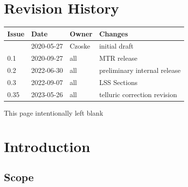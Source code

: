 \documentclass[11pt,oneside,a4paper]{article}
\begin{document}





\clearpage
\pagestyle{fancy}

\section*{Revision History}

\renewcommand{\arraystretch}{1.2}
\begin{tabularx}{\textwidth}{|l|l|l|X|}
  \hline
  \rowcolor{rd1}
  \textbf{Issue} & \textbf{Date} & \textbf{Owner} & \textbf{Changes} \\
  \hline
                 & 2020-05-27    & Czoske         & initial draft    \\
  0.1            & 2020-09-27    & all            & MTR release      \\
  0.2            & 2022-06-30    & all            & preliminary internal release      \\
  0.3            & 2022-09-07    & all  & LSS Sections \\
  0.35           & 2023-05-26    & all   & telluric correction revision \\
  \hline
\end{tabularx}


\newpage
\tableofcontents
\clearpage
\listoffigures
\clearpage
\listoftables

\clearpage
\phantom{a}
\vfill
\begin{center}
  This page intentionally left blank
\end{center}
\vfill
\clearpage



\section{Introduction}
\label{sec:intro}

\subsection{Scope}
\end{document}
